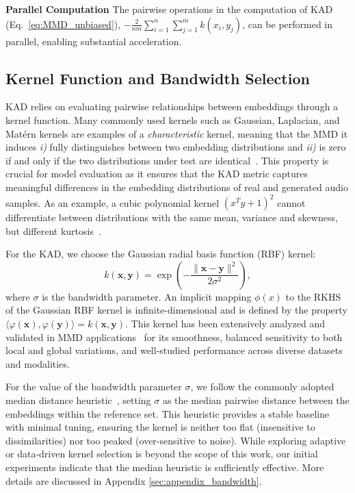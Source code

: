 \textbf{Parallel Computation} The pairwise operations in the computation of KAD (Eq.~\ref{eq:MMD_unbiased}), $- \frac{2}{nm}\sum_{i=1}^n\sum_{j=1}^m k(x_i,y_j)$, can be performed in parallel, enabling substantial acceleration. 


\subsection{Kernel Function and Bandwidth Selection}\label{subsec:kad_kernel}

KAD relies on evaluating pairwise relationships between embeddings through a kernel function. Many commonly used kernels such as Gaussian, Laplacian, and Matérn kernels are examples of a \textit{characteristic} kernel, meaning that the MMD it induces \textit{i)} fully distinguishes between two embedding distributions and \textit{ii)} is zero if and only if the two distributions under test are identical~\cite{sriperumbudur2011universality}. This property is crucial for model evaluation as it ensures that the KAD metric captures meaningful differences in the embedding distributions of real and generated audio samples. As an example, a cubic polynomial kernel $(x^Ty + 1)^2$ cannot differentiate between distributions with the same mean, variance and skewness, but different kurtosis~\cite{sriperumbudur2010hilbert}.

For the KAD, we choose the Gaussian radial basis function (RBF) kernel:
\begin{equation}
    k(\mathbf{x}, \mathbf{y}) = \exp\left(-\frac{\|\mathbf{x}-\mathbf{y}\|^2}{2\sigma^2}\right),
\end{equation}
where $\sigma$ is the bandwidth parameter. An implicit mapping $\phi(x)$ to the RKHS of the Gaussian RBF kernel is infinite-dimensional and is defined by the property $\langle \varphi(\mathbf{x}), \varphi(\mathbf{y}) \rangle = k(\mathbf{x}, \mathbf{y})$. This kernel has been extensively analyzed and validated in MMD applications~\cite{jayasumana2024rethinking, rustamov2019closed} for its smoothness, balanced sensitivity to both local and global variations, and well-studied performance across diverse datasets and modalities.

For the value of the bandwidth parameter $\sigma$, we follow the commonly adopted median distance heuristic~\cite{grettonmmd}, setting $\sigma$ as the median pairwise distance between the embeddings within the reference set. This heuristic provides a stable baseline with minimal tuning, ensuring the kernel is neither too flat (insensitive to dissimilarities) nor too peaked (over-sensitive to noise). While exploring adaptive or data-driven kernel selection is beyond the scope of this work, our initial experiments indicate that the median heuristic is sufficiently effective. More details are discussed in Appendix \ref{sec:appendix_bandwidth}.
